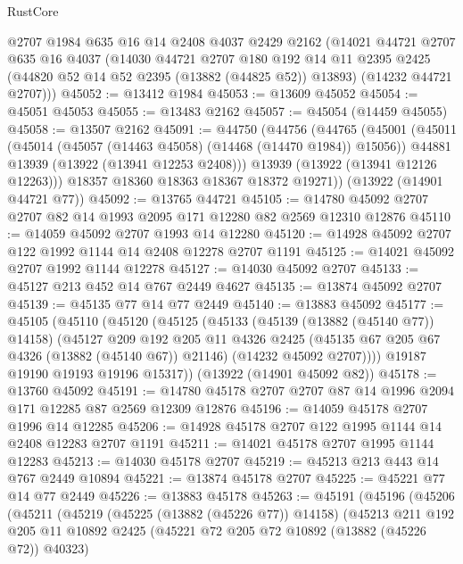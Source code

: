 \begin{lexlean}{RustCore}
\begin{coremodule}
    @2707
    @1984
    @635
    @16
    @14
    @2408
    @4037
    @2429
    @2162
    (@14021
      @44721
      @2707
      @635
      @16
      @4037
      (@14030
        @44721
        @2707
        @180
        @192
        @14
        @11
        @2395
        @2425
        (@44820 @52 @14 @52 @2395 (@13882 (@44825 @52)) @13893)
        (@14232 @44721 @2707)))
@45052 := @13412 @1984
@45053 := @13609 @45052
@45054 := @45051 @45053
@45055 := @13483 @2162
@45057 := @45054 (@14459 @45055)
@45058 := @13507 @2162
@45091 := @44750
    (@44756
      (@44765
        (@45001
          (@45011
            (@45014 (@45057 (@14463 @45058) (@14468 (@14470 @1984)) @15056))
            @44881
            @13939
            (@13922 (@13941 @12253 @2408)))
          @13939
          (@13922 (@13941 @12126 @12263)))
        @18357
        @18360
        @18363
        @18367
        @18372
        @19271))
    (@13922 (@14901 @44721 @77))
@45092 := @13765 @44721
@45105 := @14780 @45092 @2707 @2707 @82 @14 @1993 @2095 @171 @12280 @82 @2569 @12310 @12876
@45110 := @14059 @45092 @2707 @1993 @14 @12280
@45120 := @14928 @45092 @2707 @122 @1992 @1144 @14 @2408 @12278 @2707 @1191
@45125 := @14021 @45092 @2707 @1992 @1144 @12278
@45127 := @14030 @45092 @2707
@45133 := @45127 @213 @452 @14 @767 @2449 @4627
@45135 := @13874 @45092 @2707
@45139 := @45135 @77 @14 @77 @2449
@45140 := @13883 @45092
@45177 := @45105
    (@45110
      (@45120
        (@45125
          (@45133
            (@45139 (@13882 (@45140 @77)) @14158)
            (@45127
              @209
              @192
              @205
              @11
              @4326
              @2425
              (@45135 @67 @205 @67 @4326 (@13882 (@45140 @67)) @21146)
              (@14232 @45092 @2707))))
        @19187
        @19190
        @19193
        @19196
        @15317))
    (@13922 (@14901 @45092 @82))
@45178 := @13760 @45092
@45191 := @14780 @45178 @2707 @2707 @87 @14 @1996 @2094 @171 @12285 @87 @2569 @12309 @12876
@45196 := @14059 @45178 @2707 @1996 @14 @12285
@45206 := @14928 @45178 @2707 @122 @1995 @1144 @14 @2408 @12283 @2707 @1191
@45211 := @14021 @45178 @2707 @1995 @1144 @12283
@45213 := @14030 @45178 @2707
@45219 := @45213 @213 @443 @14 @767 @2449 @10894
@45221 := @13874 @45178 @2707
@45225 := @45221 @77 @14 @77 @2449
@45226 := @13883 @45178
@45263 := @45191
    (@45196
      (@45206
        (@45211
          (@45219
            (@45225 (@13882 (@45226 @77)) @14158)
            (@45213
              @211
              @192
              @205
              @11
              @10892
              @2425
              (@45221 @72 @205 @72 @10892 (@13882 (@45226 @72)) @40323)

\end{coremodule}
\end{lexlean}
